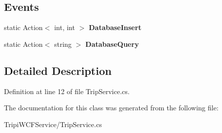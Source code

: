 \subsection*{Events}
\begin{DoxyCompactItemize}
\item 
\hypertarget{class_tripi_w_c_f_1_1_service_1_1_trip_service_afdebab617e6e7caaf118bcfb7ce3d7a1}{
static Action$<$ int, int $>$ {\bfseries DatabaseInsert}}
\label{class_tripi_w_c_f_1_1_service_1_1_trip_service_afdebab617e6e7caaf118bcfb7ce3d7a1}

\item 
\hypertarget{class_tripi_w_c_f_1_1_service_1_1_trip_service_aa0bc7b737cf91139934f7e69ba01164a}{
static Action$<$ string $>$ {\bfseries DatabaseQuery}}
\label{class_tripi_w_c_f_1_1_service_1_1_trip_service_aa0bc7b737cf91139934f7e69ba01164a}

\end{DoxyCompactItemize}


\subsection{Detailed Description}


Definition at line 12 of file TripService.cs.

The documentation for this class was generated from the following file:\begin{DoxyCompactItemize}
\item 
TripiWCFService/TripService.cs\end{DoxyCompactItemize}
